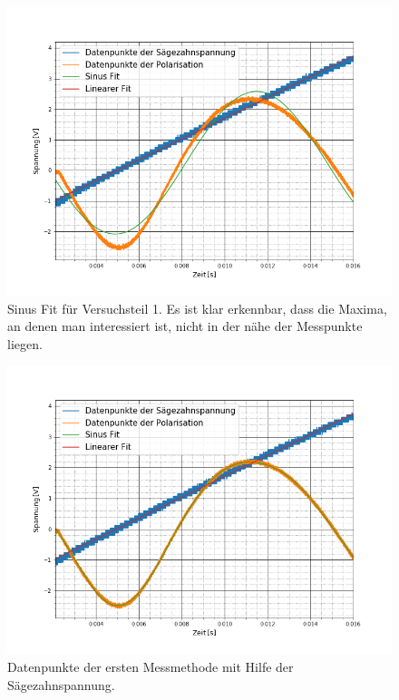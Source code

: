 \begin{figure}[ht]
	\includegraphics[scale=0.5]{Bild/SinusProblem}
	\centering
	\caption[Sinus Fit an die Messpunkte Versuchsteil 1]{Sinus Fit für Versuchsteil 1. Es ist klar erkennbar, dass die Maxima, an denen man interessiert ist, nicht in der nähe der Messpunkte liegen.}
	\label{ProbelmSinus}
\end{figure}
\begin{figure}[ht]
	\includegraphics[scale=0.5]{Bild/V1_2}
	\centering
	\caption[Plot zu Versuchsteil 1 Nr.2]{Datenpunkte der ersten Messmethode mit Hilfe der Sägezahnspannung.}
\end{figure}
